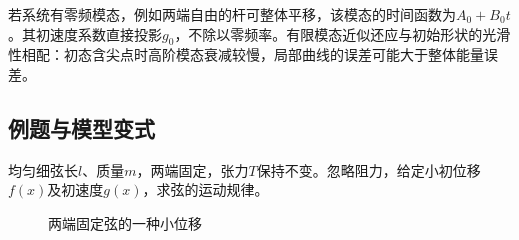 若系统有零频模态，例如两端自由的杆可整体平移，该模态的时间函数为$A_0+B_0t$。其初速度系数直接投影$g_0$，不除以零频率。有限模态近似还应与初始形状的光滑性相配：初态含尖点时高阶模态衰减较慢，局部曲线的误差可能大于整体能量误差。


\subsection{例题与模型变式}

\begin{example}[两端固定弦的完整运动]\label{ex:hw7-6}

均匀细弦长$l$、质量$m$，两端固定，张力$T$保持不变。忽略阻力，给定小初位移$f(x)$及初速度$g(x)$，求弦的运动规律。

\end{example}


\begin{figure}[H]\centering
{}
\caption{两端固定弦的一种小位移}\label{fig:hw7-6-q}
\end{figure}

